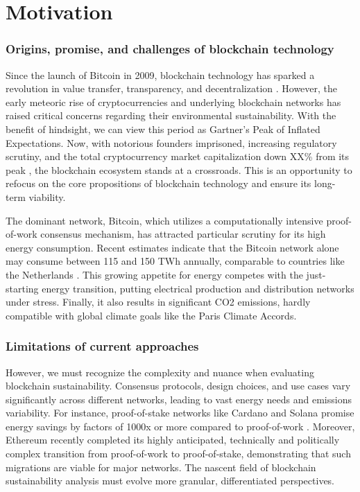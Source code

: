 \documentclass[11pt]{report}
\begin{document}
\section{Motivation}
\subsubsection*{Origins, promise, and challenges of blockchain technology}
Since the launch of Bitcoin in 2009, blockchain technology has sparked a revolution in value transfer, transparency, and decentralization \cite{nakamotoBitcoinPeertopeerElectronic2008}. However, the early meteoric rise of cryptocurrencies and underlying blockchain networks has raised critical concerns regarding their environmental sustainability. With the benefit of hindsight, we can view this period as Gartner's Peak of Inflated Expectations. Now, with notorious founders imprisoned, increasing regulatory scrutiny, and the total cryptocurrency market capitalization down
XX\% from its peak , the blockchain ecosystem stands at a crossroads. This is an opportunity to refocus on the core propositions of blockchain technology and ensure its long-term viability.


The dominant network, Bitcoin, which utilizes a computationally intensive proof-of-work consensus mechanism, has attracted particular scrutiny for its high energy consumption. Recent estimates indicate that the Bitcoin network alone may consume between 115 and 150 TWh annually, comparable to countries like the Netherlands \cite{devriesRevisitingBitcoinCarbon2022,neumuellerCambridgeBitcoinElectricity2021}. This growing appetite for energy competes with the just-starting energy transition, putting electrical production and distribution networks under stress. Finally, it also results in significant CO2 emissions, hardly compatible with global climate goals like the Paris Climate Accords.

\subsubsection*{Limitations of current approaches}
However, we must recognize the complexity and nuance when evaluating blockchain sustainability. Consensus protocols, design choices, and use cases vary significantly across different networks, leading to vast energy needs and emissions variability. For instance, proof-of-stake networks like Cardano and Solana promise energy savings by factors of 1000x or more compared to proof-of-work \cite{kohliAnalysisEnergyConsumption2023}. Moreover, Ethereum recently completed its highly anticipated, technically and politically complex transition from proof-of-work to proof-of-stake, demonstrating that such migrations are viable for major networks. \cite{bloombergnewsEthereumMergeYour2022} The nascent field of blockchain sustainability analysis must evolve more granular, differentiated perspectives.
\end{document}
